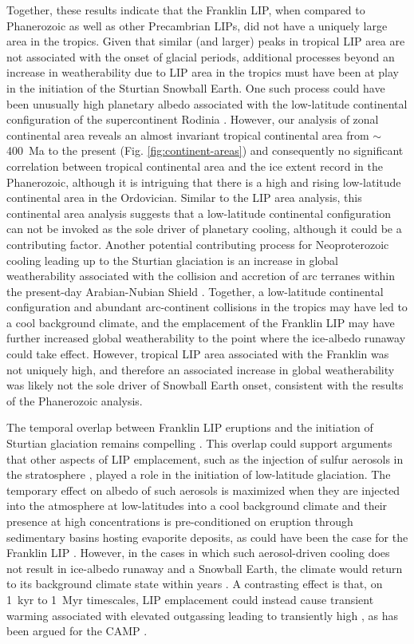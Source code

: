 Together, these results indicate that the Franklin LIP, when compared to Phanerozoic as well as other Precambrian LIPs, did not have a uniquely large area in the tropics. Given that similar (and larger) peaks in tropical LIP area are not associated with the onset of glacial periods, additional processes beyond an increase in weatherability due to LIP area in the tropics must have been at play in the initiation of the Sturtian Snowball Earth. One such process could have been unusually high planetary albedo associated with the low-latitude continental configuration of the supercontinent Rodinia \citep{Kirschvink1992a, Li2008a}. However, our analysis of zonal continental area reveals an almost invariant tropical continental area from $\sim$400~Ma to the present (Fig. \ref{fig:continent-areas}) and consequently no significant correlation between tropical continental area and the ice extent record in the Phanerozoic, although it is intriguing that there is a high and rising low-latitude continental area in the Ordovician. Similar to the LIP area analysis, this continental area analysis suggests that a low-latitude continental configuration can not be invoked as the sole driver of planetary cooling, although it could be a contributing factor. Another potential contributing process for Neoproterozoic cooling leading up to the Sturtian glaciation is an increase in global weatherability associated with the collision and accretion of arc terranes within the present-day Arabian-Nubian Shield \citep{Park2020a}. Together, a low-latitude continental configuration and abundant arc-continent collisions in the tropics may have led to a cool background climate, and the emplacement of the Franklin LIP may have further increased global weatherability to the point where the ice-albedo runaway could take effect. However, tropical LIP area associated with the Franklin was not uniquely high, and therefore an associated increase in global weatherability was likely not the sole driver of Snowball Earth onset, consistent with the results of the Phanerozoic analysis.

The temporal overlap between Franklin LIP eruptions and the initiation of Sturtian glaciation remains compelling \citep{Macdonald2010a, MacLennan2018a}. This overlap could support arguments that other aspects of LIP emplacement, such as the injection of sulfur aerosols in the stratosphere \citep{Macdonald2017a}, played a role in the initiation of low-latitude glaciation. The temporary effect on albedo of such aerosols is maximized when they are injected into the atmosphere at low-latitudes into a cool background climate and their presence at high concentrations is pre-conditioned on eruption through sedimentary basins hosting evaporite deposits, as could have been the case for the Franklin LIP \citep{Macdonald2017a}. However, in the cases in which such aerosol-driven cooling does not result in ice-albedo runaway and a Snowball Earth, the climate would return to its background climate state within years \citep{Macdonald2017a}. A contrasting effect is that, on 1~kyr to 1~Myr timescales, LIP emplacement could instead cause transient warming associated with elevated \COtwo outgassing leading to transiently high \pCOtwo, as has been argued for the CAMP \citep{Schaller2011a, Schaller2012a}.

